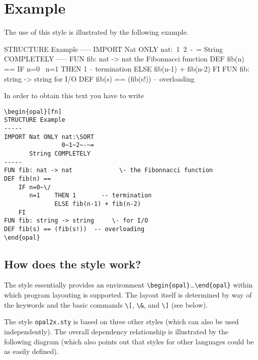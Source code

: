 

\section{Example}

The use of this style is illustrated by the following example.

\begin{opal}[fn]
STRUCTURE Example
-----
IMPORT Nat ONLY nat:~1~2~-~=
       String COMPLETELY
-----
FUN fib: nat -> nat             \- the Fibonnacci function
DEF fib(n) ==
    IF n=0~\/
       n=1    THEN 1       -- termination
              ELSE fib(n-1) + fib(n-2)
    FI
FUN fib: string -> string     \- for I/O
DEF fib(s) == (fib(s!))  -- overloading
\end{opal}

In order to obtain this text you have to write


\begin{verbatim}\begin{opal}[fn]
STRUCTURE Example
-----
IMPORT Nat ONLY nat:\SORT
                0~1~2~-~=
       String COMPLETELY
-----
FUN fib: nat -> nat             \- the Fibonnacci function
DEF fib(n) ==
    IF n=0~\/
       n=1    THEN 1       -- termination
              ELSE fib(n-1) + fib(n-2)
    FI
FUN fib: string -> string     \- for I/O
DEF fib(s) == (fib(s!))  -- overloading
\end{opal}\end{verbatim}






\subsection*{How does the style work?}

The style essentially provides an environment
\verb+\begin{opal}+\ldots\verb+\end{opal}+ within which program layouting
is supported. The layout itself is determined by way of the \Opal keywords
and the basic commands \verb+\[+, \verb+\&+, and \verb+\]+ (see below).

The style \texttt{opal2x.sty} is based on three other styles (which can
also be used independently). The overall dependency relationship is
illustrated by the following diagram (which also points out that styles for
other languages could be as easily defined).

